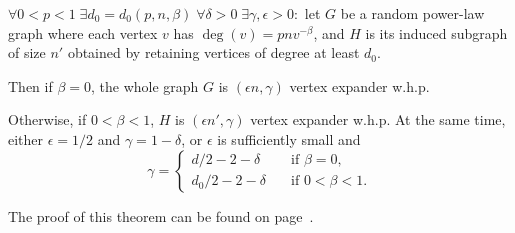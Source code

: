 \begin{theorem}
    \label{thm:powerlaw-permutation-vertex-expansion}
    $\forall 0<p<1\;\exists d_0=d_0(p,n,\beta)\;\forall\delta>0\;\exists\gamma,\epsilon>0:$
    let $G$ be a random power-law graph where each vertex $v$ has $\deg(v)=pnv^{-\beta}$,
    and $H$ is its induced subgraph of size $n'$ obtained by retaining vertices of degree at least $d_0$.
    
    Then if $\beta=0$, the whole graph $G$ is $(\epsilon n,\gamma)$ vertex expander w.h.p.
    
    Otherwise, if $0<\beta<1$, $H$ is $(\epsilon n',\gamma)$ vertex expander w.h.p.
    At the same time, either $\epsilon=1/2$ and $\gamma=1-\delta$,
    or $\epsilon$ is sufficiently small and
    \begin{equation}
        \gamma=\begin{cases}
            d/2-2-\delta & \quad \text{if } \beta=0,\\
            d_0/2-2-\delta & \quad \text{if } 0<\beta<1.
        \end{cases}
    \end{equation}
\end{theorem}

The proof of this theorem can be found on page~\pageref*{prf:powerlaw-permutation-vertex-expansion}.

